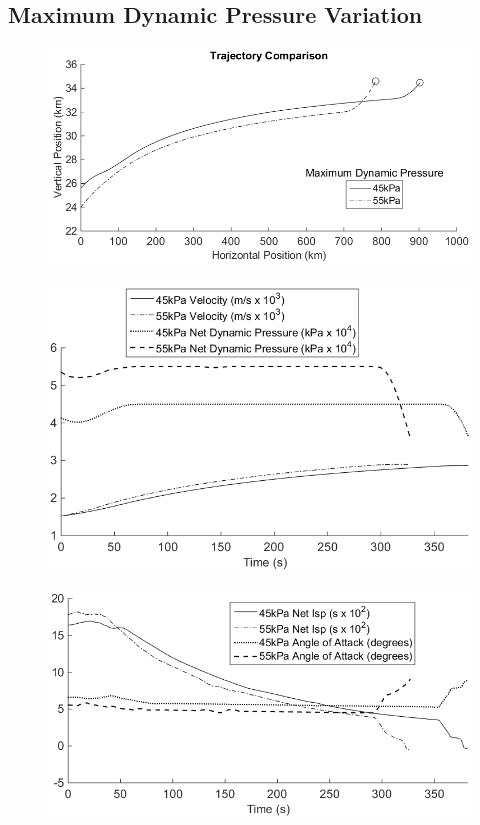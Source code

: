 \subsection{Maximum Dynamic Pressure Variation}
\begin{figure}
\centering
\includegraphics[width=0.7\linewidth]{figures/5_Ascent/Multipleq}
\caption{}
\label{fig:Multipleq}
\end{figure}
\begin{figure}
\centering
\includegraphics[width=0.7\linewidth]{figures/5_Ascent/MultipleqAero}
\caption{}
\label{fig:MultipleqAero}
\end{figure}
\begin{figure}
\centering
\includegraphics[width=0.7\linewidth]{figures/5_Ascent/Multipleq-Vehicle}
\caption{}
\label{fig:Multipleq-Vehicle}
\end{figure}

